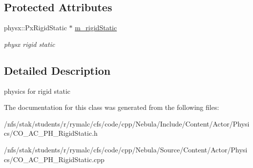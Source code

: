\subsection*{Protected Attributes}
\begin{DoxyCompactItemize}
\item 
\hypertarget{classContent_1_1Actor_1_1Physics_1_1RigidStatic_a1c4b4c14b198a4003170ec549a523df0}{
physx::PxRigidStatic $\ast$ \hyperlink{classContent_1_1Actor_1_1Physics_1_1RigidStatic_a1c4b4c14b198a4003170ec549a523df0}{m\_\-rigidStatic}}
\label{classContent_1_1Actor_1_1Physics_1_1RigidStatic_a1c4b4c14b198a4003170ec549a523df0}

\begin{DoxyCompactList}\small\item\em physx rigid static \item\end{DoxyCompactList}\end{DoxyCompactItemize}


\subsection{Detailed Description}
physics for rigid static 

The documentation for this class was generated from the following files:\begin{DoxyCompactItemize}
\item 
/nfs/stak/students/r/rymalc/cfs/code/cpp/Nebula/Include/Content/Actor/Physics/CO\_\-AC\_\-PH\_\-RigidStatic.h\item 
/nfs/stak/students/r/rymalc/cfs/code/cpp/Nebula/Source/Content/Actor/Physics/CO\_\-AC\_\-PH\_\-RigidStatic.cpp\end{DoxyCompactItemize}
